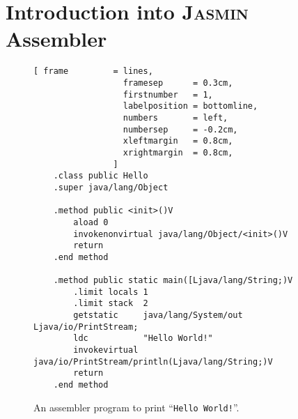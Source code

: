 \section{Introduction into \textsc{Jasmin} Assembler}

\begin{figure}[!ht]
\centering
\begin{Verbatim}[ frame         = lines, 
                  framesep      = 0.3cm, 
                  firstnumber   = 1,
                  labelposition = bottomline,
                  numbers       = left,
                  numbersep     = -0.2cm,
                  xleftmargin   = 0.8cm,
                  xrightmargin  = 0.8cm,
                ]
    .class public Hello
    .super java/lang/Object
    
    .method public <init>()V
        aload 0
        invokenonvirtual java/lang/Object/<init>()V
        return
    .end method
    
    .method public static main([Ljava/lang/String;)V
        .limit locals 1
        .limit stack  2
        getstatic     java/lang/System/out Ljava/io/PrintStream;
        ldc           "Hello World!"
        invokevirtual java/io/PrintStream/println(Ljava/lang/String;)V 
        return
    .end method
\end{Verbatim}
\vspace*{-0.3cm}
\caption{An assembler program to print ``\texttt{Hello World!}''.}
\label{fig:Hello.jas}
\end{figure}

